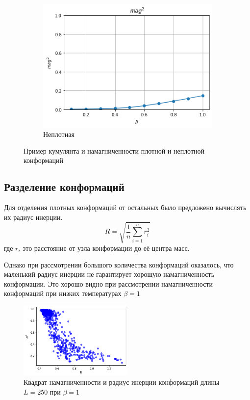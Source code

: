 \begin{figure}[ht]
\begin{subfigure}[t]{0.48\textwidth}
		\includegraphics[width=\textwidth]{../images/loose_magnetization.png} 
		\caption{Неплотная}
	\end{subfigure}
	\caption{Пример кумулянта и намагниченности плотной и неплотной конформаций}
\end{figure}


\subsection{Разделение конформаций}

Для отделения плотных конформаций от остальных было предложено вычислять их радиус инерции. 
\[
R = \sqrt{\frac{1}{n}\sum_{i=1}^{n}r_{i}^{2}}
\]
где $r_i$ это расстояние от узла конформации до её центра масс. 

Однако при рассмотрении большого количества конформаций оказалось, что маленький радиус инерции не гарантирует хорошую намагниченность конформации. Это хорошо видно при рассмотрении намагниченности конформаций при низких температурах $\beta = 1$

\begin{figure}[ht]
	\centering
	\includegraphics[width=0.5\textwidth]{../images/mag2_to_R_L250.png} 
	\caption{Квадрат намагниченности и радиус инерции конформаций длины $L = 250$ при $\beta = 1$}
	\label{fig:mag2_to_R} 
\end{figure}

